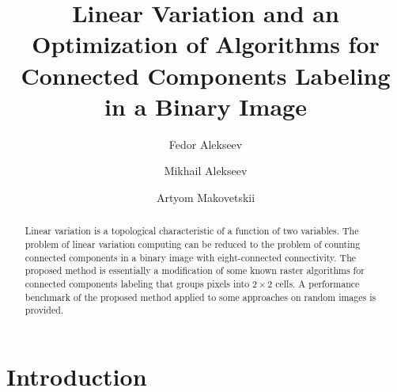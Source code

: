 \documentclass[hidelinks]{llncs}
\begin{document}
\title{Linear Variation and an Optimization of Algorithms for Connected
Components Labeling in a Binary Image}

\author{Fedor Alekseev \and Mikhail Alekseev
\and Artyom Makovetskii}


\maketitle              %

\begin{abstract}
Linear variation is a topological characteristic of a function of two
variables. The problem of linear variation computing can be reduced to the
problem of counting connected components in a binary image with eight-connected
connectivity.
The proposed method is essentially a modification of some known raster
algorithms for connected components labeling that groups pixels into $2 \times
2$ cells. A performance benchmark of the proposed method applied to some
approaches on random images is provided.

\end{abstract}

\section{Introduction}

\end{document}
